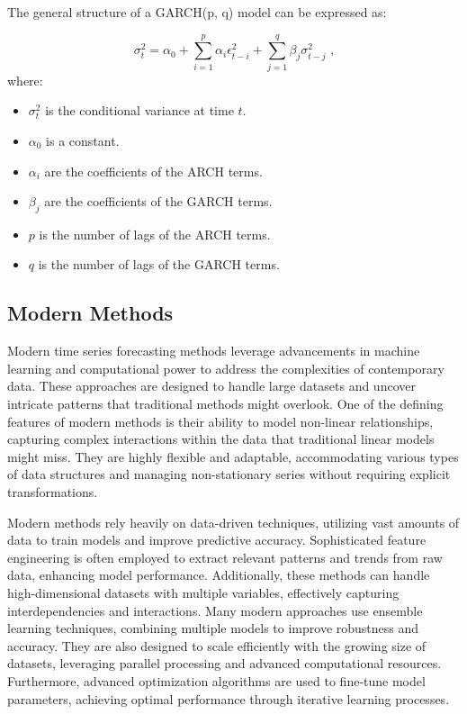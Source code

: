 The general structure of a GARCH(p, q) model can be expressed as:

\begin{equation}
\sigma_t^2 = \alpha_0 + \sum_{i=1}^p \alpha_i \epsilon_{t-i}^2 + \sum_{j=1}^q \beta_j \sigma_{t-j}^2 \text{ ,}
\end{equation}where:
\begin{itemize}
    \item \( \sigma_t^2 \) is the conditional variance at time \( t \).
    \item \( \alpha_0 \) is a constant.
    \item \( \alpha_i \) are the coefficients of the ARCH terms.
    \item \( \beta_j \) are the coefficients of the GARCH terms.
    \item \( p \) is the number of lags of the ARCH terms.
    \item \( q \) is the number of lags of the GARCH terms.
\end{itemize}
\vspace{10pt}



\subsection{Modern Methods}

Modern time series forecasting methods leverage advancements in machine learning and computational power to address the complexities of contemporary data. These approaches are designed to handle large datasets and uncover intricate patterns that traditional methods might overlook. One of the defining features of modern methods is their ability to model non-linear relationships, capturing complex interactions within the data that traditional linear models might miss. They are highly flexible and adaptable, accommodating various types of data structures and managing non-stationary series without requiring explicit transformations.

Modern methods rely heavily on data-driven techniques, utilizing vast amounts of data to train models and improve predictive accuracy. Sophisticated feature engineering is often employed to extract relevant patterns and trends from raw data, enhancing model performance. Additionally, these methods can handle high-dimensional datasets with multiple variables, effectively capturing interdependencies and interactions. Many modern approaches use ensemble learning techniques, combining multiple models to improve robustness and accuracy. They are also designed to scale efficiently with the growing size of datasets, leveraging parallel processing and advanced computational resources. Furthermore, advanced optimization algorithms are used to fine-tune model parameters, achieving optimal performance through iterative learning processes.
\vspace{10pt}


